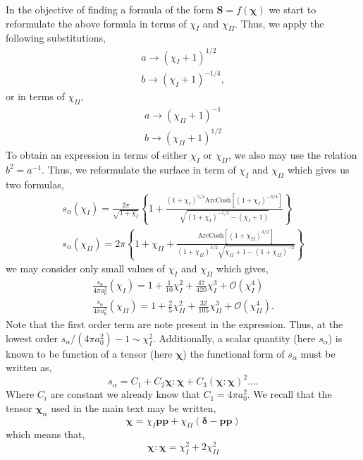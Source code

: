 In the objective of finding a formula of the form $\textbf{S} = f(\bm\chi)$ we start to reformulate the above formula in terms of $\chi_I$ and $\chi_{II}$. 
Thus, we apply the following substitutions, 
\begin{align*}
    a \to (\chi_I +1)^{1/2}\\
    b \to (\chi_I+1)^{-1/4},
\end{align*}
or in terms of $\chi_{II}$, 
\begin{align*}
    a \to (\chi_{II} +1)^{-1}\\
    b \to (\chi_{II}+1)^{1/2} 
\end{align*}
To obtain an expression in terms of either $\chi_I$ or $\chi_{II}$, 
we also may use the relation $b^2 = a^{-1}$. 
Thus, we reformulate the surface in term of $\chi_I$ and $\chi_{II}$ which gives us two formulas, 
\begin{align*}
    s_\alpha(\chi_I)
    = \frac{2\pi}{\sqrt{1+ \chi_I}}\left\{
        1 + \frac{(1+\chi_I)^{5/4} \text{ArcCosh}[(1+\chi_I)^{-3/4}]}{\sqrt{(1+\chi_I)^{-1/2}-(\chi_I+1)}}
    \right\}\\
    s_\alpha(\chi_{II})
    = 2\pi
    \left\{
        1 +\chi_{II} 
        + \frac{
            \text{ArcCosh}[(1+\chi_{II})^{3/2}]
            }{
                (1+\chi_{II})^{3/2}
                \sqrt{\chi_{II}+1- (1+\chi_{II})^{-2}}
                }
    \right\}
\end{align*}
we may consider only small values of $\chi_I$ and $\chi_{II}$ which gives,
\begin{align*}
    \frac{s_\alpha}{4\pi a_0^2}(\chi_I)
    = 
    1  
    + \frac{1}{10}\chi_I^2 
    + \frac{47}{420}\chi_I^3 
    + \mathcal{O}(\chi_I^4)\\ 
    \frac{s_\alpha}{4\pi a_0^2}(\chi_{II})
    = 
    1  
    + \frac{2}{5}\chi_{II}^2 
    + \frac{32}{105}\chi_{II}^3 
    + \mathcal{O}(\chi_{II}^4). 
\end{align*}
Note that the first order term are note present in the expression. 
Thus, at the lowest order $s_\alpha/(4\pi a_0^2) - 1 \sim  \chi_I^2$. 
Additionally, a scalar quantity (here $s_\alpha$) is known to be function of a tensor (here $\bm\chi$) the functional form of $s_\alpha$ must be written as, 
\begin{equation*}
    s_\alpha 
    =C_1 + C_2 \bm\chi:\bm\chi + C_3  (\bm\chi:\bm\chi)^2 \ldots.
\end{equation*}
Where $C_i$ are constant we already know that $C_1 = 4\pi a_0^2$. 
We recall that the tensor $\bm\chi_\alpha$ used in the main text may be written, 
\begin{equation*}
    \bm\chi = \chi_I \textbf{pp} + \chi_{II}(\bm\delta - \textbf{pp})
\end{equation*}
which means that, 
\begin{equation*}
    \bm\chi : \bm\chi 
    = 
    \chi_I^2 
    + 
    2 \chi_{II}^2
\end{equation*}

